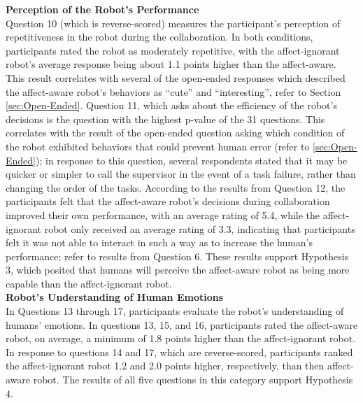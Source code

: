 \documentclass[12pt]{report}
\begin{document}
\hspace*{-8mm} \textbf{Perception of the Robot's Performance} 
\label{sec:Performance}
\\Question 10 (which is reverse-scored) measures the participant's perception of
repetitiveness in the robot during the collaboration. In both conditions,
participants rated the robot as moderately repetitive, with the affect-ignorant
robot's average response being about 1.1 points higher than the affect-aware.
This result correlates with several of the open-ended responses which described
the affect-aware robot's behaviors as ``cute'' and ``interesting'', refer to
Section \ref{sec:Open-Ended}. Question 11, which asks about the efficiency of
the robot's decisions is the question with the highest p-value of the 31
questions. This correlates with the result of the open-ended question asking
which condition of the robot exhibited behaviors that could prevent human error
(refer to \ref{sec:Open-Ended}); in response to this question, several
respondents stated that it may be quicker or simpler to call the supervisor in
the event of a task failure, rather than changing the order of the tasks.
According to the results from Question 12, the participants felt that the
affect-aware robot's decisions during collaboration improved their own
performance, with an average rating of 5.4, while the affect-ignorant robot
only received an average rating of 3.3, indicating that participants felt it was
not able to interact in such a way as to increase the human's performance; refer
to results from Question 6. These results support Hypothesis 3, which posited
that humans will perceive the affect-aware robot as being more capable than the
affect-ignorant robot. \\

\hspace*{-8mm} \textbf{Robot's Understanding of Human Emotions} 
\label{sec:Emotions}
\\In Questions 13 through 17, participants evaluate the robot's understanding of
humans' emotions. In questions 13, 15, and 16, participants rated the
affect-aware robot, on average, a minimum of 1.8 points higher than the
affect-ignorant robot. In response to questions 14 and 17, which are
reverse-scored, participants ranked the affect-ignorant robot 1.2 and 2.0
points higher, respectively, than then affect-aware robot. The results
of all five questions in this category support Hypothesis 4. \\
\end{document}
